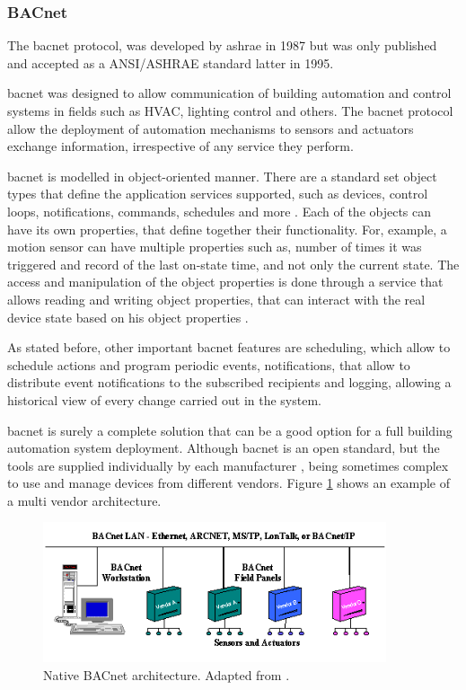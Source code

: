 \subsubsection{BACnet}
The \acf{bacnet} protocol, was developed by \acf{ashrae} in 1987 but was only published and accepted as a ANSI/ASHRAE standard latter in 1995.

\ac{bacnet} was designed to allow communication of building automation and control systems in fields such as HVAC, lighting control and others. The \ac{bacnet} protocol allow the deployment of automation mechanisms to sensors and actuators exchange information, irrespective of any service they perform.

\ac{bacnet} is modelled in object-oriented manner. There are a standard set object types that define the application services supported, such as devices, control loops, notifications, commands, schedules and more \cite{Domingues2016}. Each of the objects can have its own properties, that define together their functionality. For, example, a motion sensor can have multiple properties such as, number of times it was triggered and record of the last on-state time, and not only the current state. The access and manipulation of the object properties is done through a service that allows reading and writing object properties, that can interact with the real device state based on his object properties \cite{Fernbach2011}.

As stated before, other important \ac{bacnet} features are scheduling, which allow to schedule actions and program periodic events, notifications, that allow to distribute event notifications to the subscribed recipients \cite{Domingues2016} and logging, allowing a historical view of every change carried out in the system.

\ac{bacnet} is surely a complete solution that can be a good option for a full building automation system deployment. Although \ac{bacnet} is an open standard, but the tools are supplied individually by each manufacturer \cite{openprotocol}, being sometimes complex to use and manage devices from different vendors. Figure \ref{fig:bacnet} shows an example of a multi vendor architecture.


\begin{figure}[H]
	\centering
	\includegraphics[width=0.9\textwidth]{figures/bacnet.png}
	\caption{Native BACnet architecture. Adapted from \cite{bacnetimage}. }
	\label{fig:bacnet}
\end{figure}


